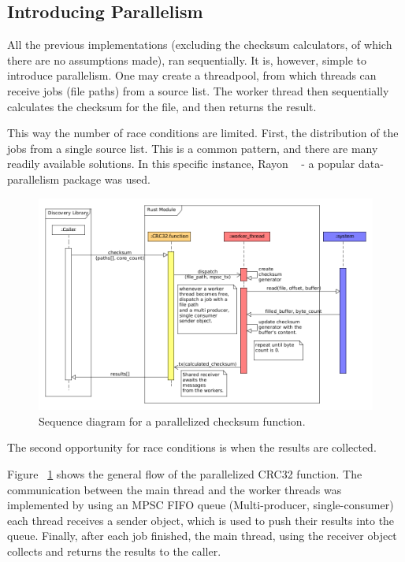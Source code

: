 \subsection{Introducing Parallelism}
All the previous implementations (excluding the checksum calculators, of which there are no assumptions made),
ran sequentially.
It is, however, simple to introduce parallelism.
One may create a threadpool, from which threads can receive jobs (file paths) from a source list.
The worker thread then sequentially calculates the checksum for the file, and then returns the result.

This way the number of race conditions are limited.
First, the distribution of the jobs from a single source list.
This is a common pattern, and there are many readily available solutions.
In this specific instance, Rayon  ~\cite{Rayon} - a popular data-parallelism package was used.

\begin{figure}[h]
    \centering
    \includegraphics[width=12cm]{figures/checksum/simple_multi_crc}
    \caption{Sequence diagram for a parallelized checksum function.}
    \label{fig:checksum_fig_4}
\end{figure}

The second opportunity for race conditions is when the results are collected.

Figure ~\ref{fig:checksum_fig_4} shows the general flow of the parallelized CRC32 function.
The communication
between the main thread and the worker threads was implemented by using an MPSC FIFO queue (Multi-producer, single-consumer)
each thread receives a sender object, which is used to push their results into the queue.
Finally, after each job finished, the main thread, using the receiver object collects and returns the results to the caller.

